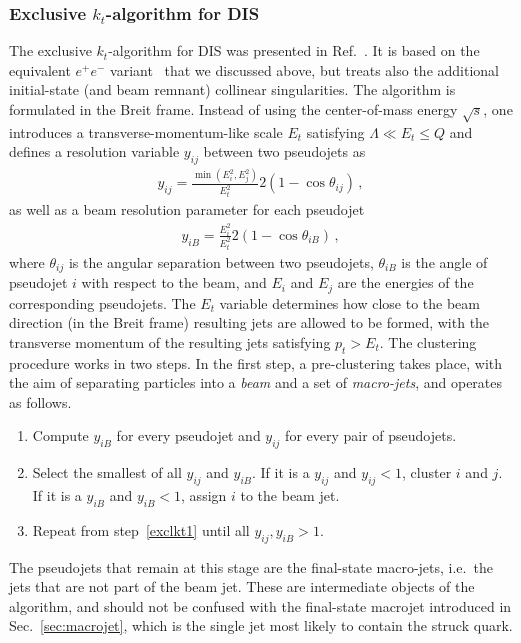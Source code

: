 \subsubsection{Exclusive $k_t$-algorithm for DIS}
\label{sec:exclktalgo}
The exclusive $k_t$-algorithm for DIS was presented in
Ref.~\cite{Catani:1992zp}.
%
It is based on the equivalent $e^+e^-$ variant~\cite{Catani:1991hj} that we discussed above, but treats also the additional initial-state (and beam remnant) collinear singularities. 
%
The algorithm is formulated in the Breit frame. 
%
Instead of using the center-of-mass energy $\sqrt{s}$, one introduces a transverse-momentum-like scale $E_t$ satisfying $\Lambda \ll E_t\le
Q$ and defines a resolution variable $y_{ij}$ between two pseudojets
as
\begin{align}
\label{eq:disyij}
y_{i j} = \frac{\min (E_i^2, E_j^2)}{E_t^2} 2 (1 - \cos \theta_{i j})\,,
\end{align}
as well as a beam resolution parameter for each pseudojet
\begin{align}
	\label{eq:disyB}
  y_{iB} = \frac{ E_i^2}{E_t^2} 2(1 - \cos \theta_{i B})\,,
\end{align}
where $\theta_{ij}$ is the angular separation between two pseudojets,
$\theta_{iB}$ is the angle of pseudojet $i$ with respect to the beam, and
$E_{i}$ and $E_j$ are the energies of the corresponding pseudojets.
%
The $E_t$ variable determines how close to the beam direction (in the Breit frame) resulting jets are allowed to be formed, with the transverse momentum of the resulting jets satisfying $p_t > E_t$. 
%
The clustering procedure works in two steps.  
%
In the first step, a pre-clustering takes place, with the aim of separating particles into a \emph{beam} and a set of \emph{macro-jets}, and operates as follows.
%
\begin{enumerate}
  \item \label{exclkt1} Compute $y_{iB}$ for every pseudojet and
    $y_{ij}$ for every pair of pseudojets.
  \item Select the smallest of all $y_{ij}$ and $y_{iB}$. If it is a
    $y_{ij}$ and $y_{ij}<1$, cluster $i$ and $j$. If it is a $y_{iB}$
    and $y_{iB}<1$, assign $i$ to the beam jet.
  \item Repeat from step~\ref{exclkt1} until all $y_{ij}, y_{iB}>1$.
\end{enumerate}
The pseudojets that remain at this stage are the final-state macro-jets, i.e.\ the
jets that are not part of the beam jet. These are intermediate objects of
the algorithm, and should not be confused with the final-state macrojet
introduced in Sec.~\ref{sec:macrojet}, which is the single jet most likely
to contain the struck quark.

